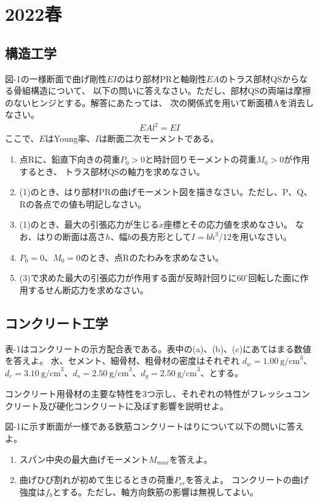 \newpage
\section{2022春}
\setcounter{yearcounter}{2022}


\subsection{構造工学}
図-1の一様断面で曲げ剛性$EI$のはり部材PRと軸剛性$EA$のトラス部材QSからなる骨組構造について、
以下の問いに答えなさい。ただし、部材QSの両端は摩擦のないヒンジとする。解答にあたっては、
次の関係式を用いて断面積Aを消去しなさい。
\begin{align*}%
  EAl^2 = EI
\end{align*}
ここで、$E$はYoung率、$I$は断面二次モーメントである。
\begin{enumerate}
  \item 点Rに、鉛直下向きの荷重$P_0>0$と時計回りモーメントの荷重$M_0>0$が作用するとき、
        トラス部材QSの軸力を求めなさい。
  \item (1)のとき、はり部材PRの曲げモーメント図を描きなさい。ただし、P、Q、Rの各点での値も明記しなさい。
  \item (1)のとき、最大の引張応力が生じる$x$座標とその応力値を求めなさい。
        なお、はりの断面は高さ$h$、幅$b$の長方形として$I = bh^3/12$を用いなさい。
  \item $P_0 = 0$、$M_0 = 0$のとき、点Rのたわみを求めなさい。
  \item (3)で求めた最大の引張応力が作用する面が反時計回りに$60^\circ$回転した面に作用するせん断応力を求めなさい。
\end{enumerate}

\subsection{コンクリート工学}

表-1はコンクリートの示方配合表である。表中の(a)、(b)、(c)にあてはまる数値を答えよ。
水、セメント、細骨材、粗骨材の密度はそれぞれ
$d_w=1.00\:\text{g/cm}^3$、$d_c=3.10\:\text{g/cm}^3$、$d_s=2.50\:\text{g/cm}^3$、$d_g=2.50\:\text{g/cm}^3$、とする。


コンクリート用骨材の主要な特性を3つ示し、それぞれの特性がフレッシュコンクリート及び硬化コンクリートに及ぼす影響を説明せよ。

図-1に示す断面が一様である鉄筋コンクリートはりについて以下の問いに答えよ。
\begin{enumerate}[(1)]
  \item スパン中央の最大曲げモーメント$M_{max}$を答えよ。
  \item 曲げひび割れが初めて生じるときの荷重$P_{cr}$を答えよ。
        コンクリートの曲げ強度は$f_b$とする。ただし、軸方向鉄筋の影響は無視してよい。
\end{enumerate}

